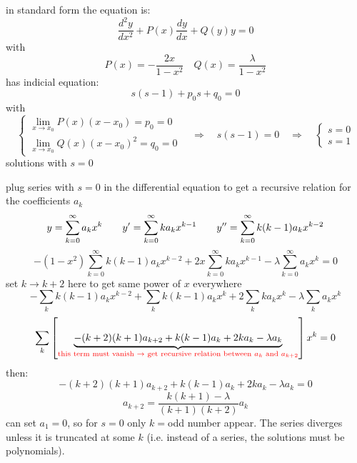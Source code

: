 \documentclass{article}
\begin{document}
\newpage
\noindent
in standard form the equation is:
\begin{equation}
    \frac{d^2y}{dx^2} + P(x) \frac{dy}{dx} + Q(y) y = 0
\end{equation}
with
\begin{equation}
    P(x) = -\frac{2x}{1-x^2} \quad Q(x) = \frac{\lambda}{1-x^2}
\end{equation}
has indicial equation:
\begin{equation}
    s(s-1) + p_0 s + q_0 = 0
\end{equation}
with
\begin{equation}
    \begin{cases}
        \lim_{x \rightarrow x_0} P(x) (x-x_0) = p_0 = 0 \\
        \lim_{x \rightarrow x_0} Q(x) (x-x_0)^2 = q_0 = 0 
    \end{cases} \quad \Rightarrow \quad s(s-1) = 0 \quad \Rightarrow \quad \begin{cases}
        s=0 \\ s=1
    \end{cases}
\end{equation}
solutions with $s=0$

\noindent
plug series with $s=0$ in the differential equation to get a recursive relation for the coefficients $a_k$
\begin{equation}
    y = \sum_{k=0}^{\infty} a_k x^k \qquad y' = \sum_{k=0}^{\infty} k a_k x^{k-1} \qquad   y'' = \sum_{k=0}^{\infty} k(k-1) a_k x^{k-2} \\
\end{equation}
\begin{equation}
    -(1 - x^2) \sum_{k=0}^{\infty} k(k-1) a_k x^{k-2}
+ 2x \sum_{k=0}^{\infty} k a_k x^{k-1}
- \lambda \sum_{k=0}^{\infty} a_k x^k = 0
\end{equation}
set $k \rightarrow k+2$ here to get same power of $x$ everywhere
\begin{equation*}
    - \sum_k k(k-1) a_k x^{k-2}
+ \sum_k k(k-1) a_k x^k
+ 2 \sum_k k a_k x^k
- \lambda \sum_k a_k x^k
\end{equation*}
\begin{equation}
    \sum_k \left[ \underbrace{
-(k+2)(k+1) a_{k+2}
+ k(k-1) a_k
+ 2k a_k
- \lambda a_k}_{\color{red}\text{this term must vanish $\rightarrow$ get recursive relation between $a_k$ and $a_{k+2}$}}
\right] x^k = 0
\end{equation}
then:
\begin{equation}
    -(k+2)(k+1) a_{k+2}
+ k(k-1) a_k
+ 2k a_k
- \lambda a_k = 0
\end{equation}
\begin{equation}
    a_{k+2} = \frac{k(k+1) - \lambda}{(k+1)(k+2)} a_k
\end{equation}
can set $a_1=0$, so for $s=0$ only $k=$odd number appear. The series diverges unless it is truncated at some $k$ (i.e. instead of a series, the solutions must be polynomials).
\end{document}
